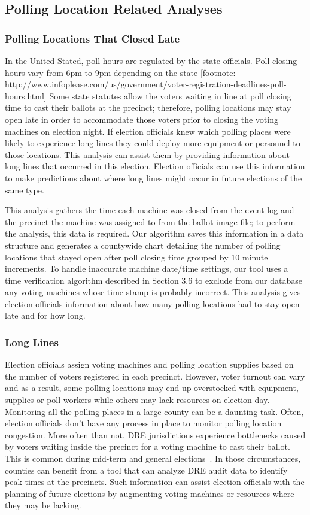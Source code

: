 \subsection{Polling Location Related Analyses}
\subsubsection{Polling Locations That Closed Late}
In the United Stated, poll hours are regulated by the state officials. Poll closing hours vary from 6pm to 9pm depending on the state [footnote: http://www.infoplease.com/us/government/voter-registration-deadlines-poll-hours.html] Some state statutes allow the voters waiting in line at poll closing time to cast their ballots at the precinct; therefore,  polling locations may stay open late in order to accommodate those voters prior to closing the voting machines on election night. If election officials knew which polling places were likely to experience long lines they could deploy more equipment or personnel to those locations. This analysis can assist them by providing information about long lines that occurred in this election. Election officials can use this information to make predictions about where long lines might occur in future elections of the same type.

This analysis gathers the time each machine was closed from the event log and the precinct the machine was assigned to from the ballot image file; to perform the analysis, this data is required.  Our algorithm saves this information in a data structure and generates a countywide chart detailing the number of polling locations that stayed open after poll closing time grouped by 10 minute increments. To handle inaccurate machine date/time settings, our tool uses a time verification algorithm described in Section 3.6 to exclude from our database any voting machines whose time stamp is probably incorrect. This analysis gives election officials information about how many polling locations had to stay open late and for how long.

\subsubsection{Long Lines}
Election officials assign voting machines and polling location supplies based on the number of voters registered in each precinct.  However, voter turnout can vary and as a result, some polling locations may end up overstocked with equipment, supplies or poll workers while others may lack resources on election day. Monitoring all the polling places in a large county can be a daunting task. Often, election officials don't have any process in place to monitor polling location congestion. More often than not, DRE jurisdictions experience bottlenecks caused by voters waiting inside the precinct for a voting machine to cast their ballot. This is common during mid-term and general elections~\cite{Kreitman2010, Slade2008, U2010}.  In those circumstances, counties can benefit from a tool that can analyze DRE audit data to identify peak times at the precincts. Such information can assist election officials with the planning of future elections by augmenting voting machines or resources where they may be lacking.

